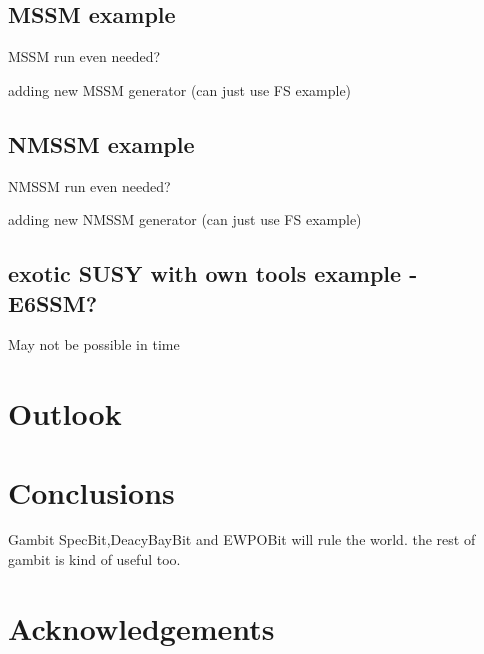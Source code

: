 \documentclass[11pt,a4paper]{article}
\begin{document}
\subsection{MSSM example}
MSSM run even needed?

adding new MSSM generator (can just use FS example)
\subsection{NMSSM example}
NMSSM run even needed?

adding new NMSSM generator (can just use FS example)
\subsection{exotic SUSY with own tools example - E6SSM?}
May not be possible in time

\section{Outlook}

\section{Conclusions}
Gambit SpecBit,DeacyBayBit and EWPOBit will rule the world.  the rest of gambit is kind of useful too.
\section{Acknowledgements}
\end{document}
